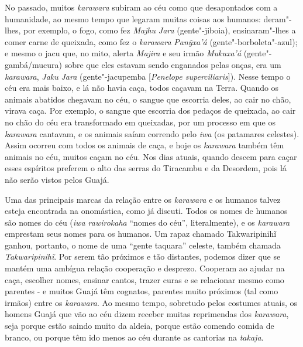 No passado, muitos \emph{karawara} subiram ao céu como que desapontados
com a humanidade, ao mesmo tempo que legaram muitas coisas aos humanos:
deram"-lhes, por exemplo, o fogo, como fez \emph{Majhu} \emph{Jara}
(gente"-jiboia), ensinaram"-lhes a comer carne de queixada, como fez o
\emph{karawara} \emph{Panỹxa'á} (gente"-borboleta"-azul); e mesmo o jacu
que, no mito, alerta \emph{Majira} e seu irmão \emph{Mukuxa'á}
(gente"-gambá/mucura) sobre que eles estavam sendo enganados pelas onças,
era um \emph{karawara}, \emph{Jaku} \emph{Jara} (gente"-jacupemba
{[}\emph{Penelope superciliaris}{]}). Nesse tempo o céu era mais baixo,
e lá não havia caça, todos caçavam na Terra. Quando os animais abatidos
chegavam no céu, o sangue que escorria deles, ao cair no chão, virava
caça. Por exemplo, o sangue que escorria dos pedaços de queixada, ao
cair no chão do céu era transformado em queixadas, por um processo em
que os \emph{karawara} cantavam, e os animais saíam correndo pelo
\emph{iwa} (os patamares celestes). Assim ocorreu com todos os animais
de caça, e hoje os \emph{karawara} também têm animais no céu, muitos
caçam no céu. Nos dias atuais, quando descem para caçar esses espíritos
preferem o alto das serras do Tiracambu e da Desordem, pois lá não serão
vistos pelos Guajá.

Uma das principais marcas da relação entre os \emph{karawara} e os
humanos talvez esteja encontrada na onomástica, como já discuti. Todos
os nomes de humanos são nomes do céu (\emph{iwa rawirokaha} ``nomes do
céu'', literalmente), e os \emph{karawara} emprestam seus nomes para os
humanos. Um rapaz chamado Takwaripinihĩ ganhou, portanto, o nome de uma
``gente taquara'' celeste, também chamada \emph{Takwaripinihĩ}. Por
serem tão próximos e tão distantes, podemos dizer que se mantém uma
ambígua relação cooperação e desprezo. Cooperam ao ajudar na caça,
escolher nomes, ensinar cantos, trazer curas e se relacionar mesmo como
parentes - e muitos Guajá têm cognatos, parentes muito próximos (tal
como irmãos) entre os \emph{karawara}. Ao mesmo tempo, sobretudo pelos
costumes atuais, os homens Guajá que vão ao céu dizem receber muitas
reprimendas dos \emph{karawara}, seja porque estão saindo muito da
aldeia, porque estão comendo comida de branco, ou porque têm ido menos
ao céu durante as cantorias na \emph{takaja}.

